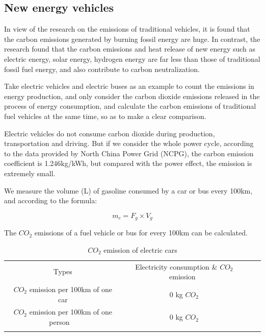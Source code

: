 \documentclass{apmcmthesis}
\begin{document}
\subsection{New energy vehicles}
In view of the research on the emissions of traditional vehicles, it is found that the carbon emissions generated by burning fossil energy are huge. In contrast, the research found that the carbon emissions and heat release of new energy such as electric energy, solar energy, hydrogen energy are far less than those of traditional fossil fuel energy, and also contribute to carbon neutralization.

Take electric vehicles and electric buses as an example to count the emissions in energy production, and only consider the carbon dioxide emissions released in the process of energy consumption, and calculate the carbon emissions of traditional fuel vehicles \cite{111} at the same time, so as to make a clear comparison.

Electric vehicles do not consume carbon dioxide during production, transportation and driving. But if we consider the whole power cycle, according to the data provided by North China Power Grid (NCPG), the carbon emission coefficient is 1.246kg/kWh, but compared with the power effect, the emission is extremely small.

We measure the volume (L) of gasoline consumed by a car or bus every 100km, and according to the formula:

$$m_{c}=F_{g} \times V_{g}$$


The $CO_2$ emissions of a fuel vehicle or bus for every 100km can be calculated.

\begin{table}
\centering

\begin{tabular}{ccll} 
\cline{1-2}
Types                                 & Electricity consumption \& $CO_2$~emission~~ &  &   \\ 
\cline{1-2}
$CO_2$ emission per 100km of one car     & 0 kg $CO_2$                                   &  &   \\ 

$CO_2$ emission per 100km of one person~~ & 0 kg $CO_2$                                   &  &   \\ 
\cline{1-2}
         & \multicolumn{1}{l}{}                      &  &  
\end{tabular}
\caption{$CO_2$ emission of electric cars}
\end{table}
\end{document}
